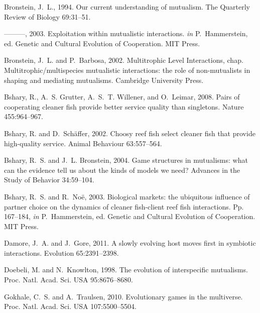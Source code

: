 \documentclass[a4paper]{scrartcl}
\begin{document}
\begin{thebibliography}{58}
Bronstein, J.~L., 1994.
\newblock Our current understanding of mutualism.
\newblock The Quarterly Review of Biology 69:31--51.

---{}---{}---, 2003.
\newblock Exploitation within mutualistic interactions.
\newblock \emph{in} P.~Hammerstein, ed. Genetic and Cultural Evolution of
  Cooperation. MIT Press.

Bronstein, J.~L. and P.~Barbosa, 2002.
\newblock Multitrophic Level Interactions, chap. Multitrophic/multispecies
  mutualistic interactions: the role of non-mutualists in shaping and mediating
  mutualisms.
\newblock Cambridge University Press.

Bshary, R., A.~S. Grutter, A.~S.~T. Willener, and O.~Leimar, 2008.
\newblock Pairs of cooperating cleaner fish provide better service quality than
  singletons.
\newblock Nature 455:964--967.

Bshary, R. and D.~Sch{\"a}ffer, 2002.
\newblock Choosy reef fish select cleaner fish that provide high-quality
  service.
\newblock Animal Behaviour 63:557--564.

Bshary, R.~S. and J.~L. Bronstein, 2004.
\newblock Game structures in mutualisms: what can the evidence tell us about
  the kinds of models we need?
\newblock Advances in the Study of Behavior 34:59--104.

Bshary, R.~S. and R.~No\"{e}, 2003.
\newblock Biological markets: the ubiquitous influence of partner choice on the
  dynamics of cleaner fish-client reef fish interactions.
\newblock Pp. 167--184, \emph{in} P.~Hammerstein, ed. Genetic and Cultural
  Evolution of Cooperation. MIT Press.

Damore, J.~A. and J.~Gore, 2011.
\newblock A slowly evolving host moves first in symbiotic interactions.
\newblock Evolution 65:2391--2398.

Doebeli, M. and N.~Knowlton, 1998.
\newblock The evolution of interspecific mutualisms.
\newblock Proc. Natl. Acad. Sci. USA 95:8676--8680.

Gokhale, C.~S. and A.~Traulsen, 2010.
\newblock Evolutionary games in the multiverse.
\newblock Proc. Natl. Acad. Sci. USA 107:5500--5504.


\end{thebibliography}
\end{document}
